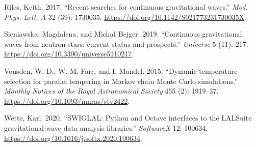 \documentclass[10pt,a4paper,onecolumn]{article}
\begin{document}
\leavevmode\hypertarget{ref-Riles:2017evm}{}%
Riles, Keith. 2017. ``Recent searches for continuous gravitational
waves.'' \emph{Mod. Phys. Lett. A} 32 (39): 1730035.
\url{https://doi.org/10.1142/S021773231730035X}.

\leavevmode\hypertarget{ref-Sieniawska:2019hmd}{}%
Sieniawska, Magdalena, and Michał Bejger. 2019. ``Continuous
gravitational waves from neutron stars: current status and prospects.''
\emph{Universe} 5 (11): 217.
\url{https://doi.org/10.3390/universe5110217}.

\leavevmode\hypertarget{ref-Vousden:2015pte}{}%
Vousden, W. D., W. M. Farr, and I. Mandel. 2015. ``Dynamic temperature
selection for parallel tempering in Markov chain Monte Carlo
simulations.'' \emph{Monthly Notices of the Royal Astronomical Society}
455 (2): 1919--37. \url{https://doi.org/10.1093/mnras/stv2422}.

\leavevmode\hypertarget{ref-Wette:2020air}{}%
Wette, Karl. 2020. ``SWIGLAL: Python and Octave interfaces to the
LALSuite gravitational-wave data analysis libraries.'' \emph{SoftwareX}
12: 100634. \url{https://doi.org/10.1016/j.softx.2020.100634}.
\end{document}

